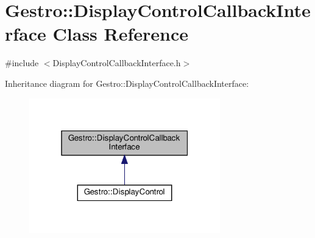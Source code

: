 \hypertarget{classGestro_1_1DisplayControlCallbackInterface}{}\section{Gestro\+:\+:Display\+Control\+Callback\+Interface Class Reference}
\label{classGestro_1_1DisplayControlCallbackInterface}


{\ttfamily \#include $<$Display\+Control\+Callback\+Interface.\+h$>$}



Inheritance diagram for Gestro\+:\+:Display\+Control\+Callback\+Interface\+:
\nopagebreak
\begin{figure}[H]
\begin{center}
\leavevmode
\includegraphics[width=235pt]{classGestro_1_1DisplayControlCallbackInterface__inherit__graph}
\end{center}
\end{figure}
